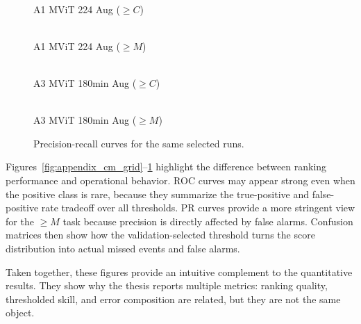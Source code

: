 \begin{figure}[!htbp]
\centering
\begin{minipage}{0.48\textwidth}
\centering
{}
\\[-1mm]\scriptsize A1 MViT 224 Aug ($\geq C$)
\end{minipage}\hfill
\begin{minipage}{0.48\textwidth}
\centering
{}
\\[-1mm]\scriptsize A1 MViT 224 Aug ($\geq M$)
\end{minipage}
\vspace{2mm}
\begin{minipage}{0.48\textwidth}
\centering
{}
\\[-1mm]\scriptsize A3 MViT 180min Aug ($\geq C$)
\end{minipage}\hfill
\begin{minipage}{0.48\textwidth}
\centering
{}
\\[-1mm]\scriptsize A3 MViT 180min Aug ($\geq M$)
\end{minipage}
\caption{Precision-recall curves for the same selected runs.}
\label{fig:appendix_pr_grid}
\end{figure}

\FloatBarrier

Figures~\ref{fig:appendix_cm_grid}--\ref{fig:appendix_pr_grid} highlight the difference between ranking performance and operational behavior. ROC curves may appear strong even when the positive class is rare, because they summarize the true-positive and false-positive rate tradeoff over all thresholds. PR curves provide a more stringent view for the $\geq M$ task because precision is directly affected by false alarms. Confusion matrices then show how the validation-selected threshold turns the score distribution into actual missed events and false alarms.

Taken together, these figures provide an intuitive complement to the quantitative results. They show why the thesis reports multiple metrics: ranking quality, thresholded skill, and error composition are related, but they are not the same object.

\let\cleardoublepage\origcleardoublepage
